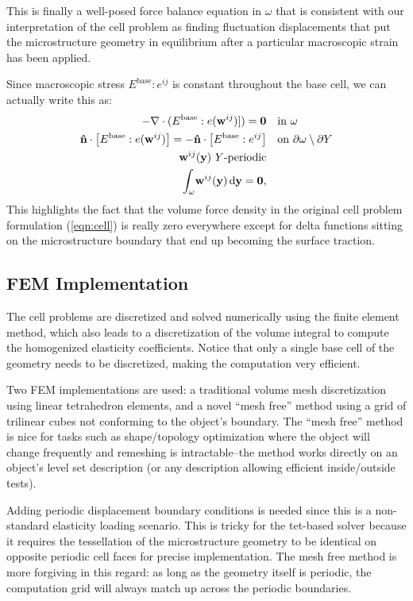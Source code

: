 \documentclass[10pt]{article}
\begin{document}
This is finally a well-posed force balance equation in $\omega$ that is
consistent with our interpretation of the cell problem as finding fluctuation
displacements that put the microstructure geometry in equilibrium after a
particular macroscopic strain has been applied.

Since macroscopic stress $E^\text{base} : e^{ij}$ is constant throughout the
base cell, we can actually write this as:
\begin{align*}
     -\nabla \cdot (E^\text{base} : e({\bf w}^{ij})]) = {\bf 0} & \quad \text{in } \omega \\
{\bf \hat n} \cdot \left[ E^\text{base} : e({\bf w}^{ij}) \right]  =  -{\bf \hat{n}} \cdot \left[ E^\text{base} : e^{ij} \right]& \quad \text{on } \partial \omega \setminus \partial Y \\
    {\bf w}^{ij}({\bf y})\ Y \text{-periodic} & \\
    \int_\omega \! {\bf w}^{ij}({\bf y})  \, \mathrm{d} {\bf y} =  {\bf 0}, 
\end{align*}
This highlights the fact that the volume force density in the original cell
problem formulation (\ref{eqn:cell}) is really zero everywhere except for delta
functions sitting on the microstructure boundary that end up becoming the
surface traction.

\subsection{FEM Implementation}
The cell problems are discretized and solved numerically using the finite
element method, which also leads to a discretization of the volume integral
to compute the homogenized elasticity coefficients. Notice that only a
single base cell of the geometry needs to be discretized, making the
computation very efficient.

Two FEM implementations are used: a traditional volume mesh discretization
using linear tetrahedron elements, and a novel ``mesh free'' method using a
grid of trilinear cubes not conforming to the object's boundary. The ``mesh
free'' method is nice for tasks such as shape/topology optimization where the
object will change frequently and remeshing is intractable--the method works
directly on an object's level set description (or any description allowing
efficient inside/outside tests).

Adding periodic displacement boundary conditions is needed since this is a
non-standard elasticity loading scenario. This is tricky for the tet-based
solver because it requires the tessellation of the microstructure geometry to be
identical on opposite periodic cell faces for precise implementation. The
mesh free method is more forgiving in this regard: as long as the geometry
itself is periodic, the computation grid will always match up across the
periodic boundaries.
\end{document}
